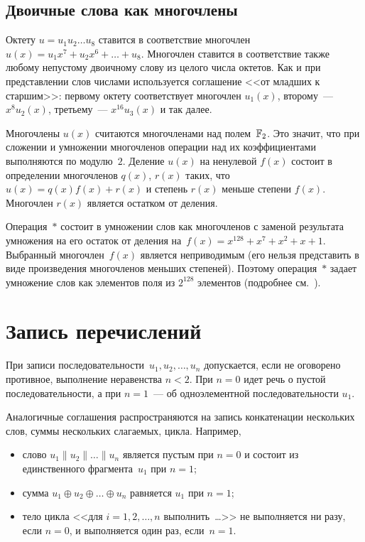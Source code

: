 \subsection{Двоичные слова как многочлены}\label{DEFS.Poly}

Октету $u=u_1 u_2\ldots u_8$ ставится в соответствие многочлен
$u(x)=u_1 x^7+u_2 x^6 +\ldots + u_8$. 
%
Многочлен ставится в соответствие также любому непустому
двоичному слову из целого числа октетов.
Как и при представлении слов числами используется 
соглашение <<от младших к старшим>>:
первому октету соответствует многочлен $u_1(x)$,
второму~--- $x^8 u_2(x)$, третьему~--- $x^{16}u_3(x)$ и так далее.

Многочлены $u(x)$ считаются многочленами над полем~$\mathbb{F}_2$. 
Это значит, что при сложении и умножении многочленов операции над их
коэффициентами выполняются по модулю~$2$.
%
Деление $u(x)$ на ненулевой $f(x)$ состоит в определении многочленов 
$q(x)$, $r(x)$ таких, что $u(x)=q(x)f(x)+r(x)$ и степень $r(x)$ меньше 
степени $f(x)$. 
Многочлен $r(x)$ является остатком от деления.

Операция~$\ast$ состоит в умножении слов как многочленов с заменой результата
умножения на его остаток от деления на~$f(x)=x^{128}+x^7+x^2+x+1$. 
%
Выбранный многочлен~$f(x)$ является неприводимым (его нельзя представить
в виде произведения многочленов меньших степеней).
Поэтому операция~$\ast$ задает умножение слов как элементов поля из $2^{128}$
элементов (подробнее см.~\cite{LidNid88}).

\section{Запись перечислений}\label{DEFS.Seqs}

При записи последовательности~$u_1,u_2,\ldots,u_n$ 
допускается, если не оговорено противное, выполнение неравенства $n<2$.
При $n=0$ идет речь о пустой последовательности, 
а при $n=1$~--- об одноэлементной последовательности $u_1$.

Аналогичные соглашения распространяются на запись конкатенации нескольких
слов, суммы нескольких слагаемых, цикла.
%
Например,
\begin{itemize}
\item
слово $u_1\parallel u_2\parallel\ldots\parallel u_n$ является пустым при $n=0$ 
и состоит из единственного фрагмента~$u_1$ при $n=1$;
\item
сумма $u_1\oplus u_2\oplus\ldots\oplus u_n$ равняется $u_1$ при $n=1$;
%
\item
тело цикла <<для $i=1,2,\ldots,n$ выполнить~\ldots>>
не выполняется ни разу, если $n=0$, и выполняется один раз, если~$n=1$.
\end{itemize}


